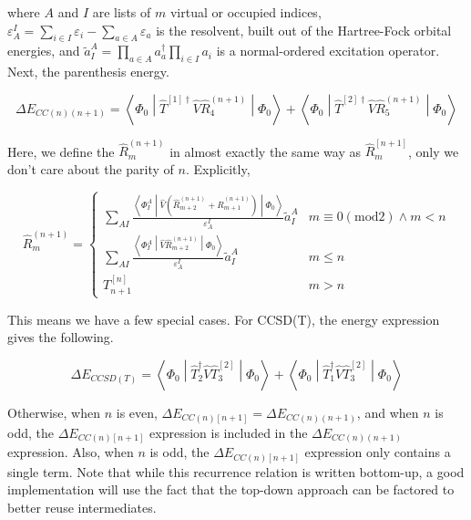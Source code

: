 \documentclass{article}
\begin{document}
where $A$ and $I$ are lists of $m$ virtual  or occupied indices, $\varepsilon_A^I = \sum_{i \in I} \varepsilon_i - \sum_{a \in A} \varepsilon_a$ is the resolvent, built out of the Hartree-Fock orbital energies, and $\tilde{a}_I^A = \prod_{a\in A}a_a^\dagger\prod_{i\in I} a_i$ is a normal-ordered excitation operator. Next, the parenthesis energy.

\begin{equation}
  \Delta E_{CC(n)(n + 1)} = \left<\Phi_0\middle|\hat{T}^{\left[1\right]\dagger}\hat{V}\hat{R}_4^{\left(n + 1\right)}\middle|\Phi_0\right> + \left<\Phi_0\middle|\hat{T}^{\left[2\right]\dagger}\hat{V}\hat{R}_5^{\left(n + 1\right)}\middle|\Phi_0\right>
\end{equation}

Here, we define the $\hat{R}_m^{\left(n + 1\right)}$ in almost exactly the same way as $\hat{R}_m^{\left[n + 1\right]}$, only we don't care about the parity of $n$. Explicitly, 

\begin{equation}
  \hat{R}_m^{\left(n + 1\right)} = \left\{\begin{matrix}
      \sum_{AI}\frac{\left<\Phi_I^A\middle|\hat{V}\left(\hat{R}_{m + 2}^{\left(n + 1\right)} + \hat{R}_{m + 1}^{\left(n + 1\right)}\right)\middle|\Phi_0\right>}{\varepsilon_A^I}\tilde{a}_I^A & m \equiv 0\left(\mathrm{mod} 2\right) \wedge m < n\\
      \sum_{AI}\frac{\left<\Phi_{I}^{A}\middle|\hat{V}\hat{R}_{m + 2}^{\left(n + 1\right)}\middle|\Phi_0\right>}{\varepsilon_A^I}\tilde{a}_I^A & m \le n\\
      T_{n + 1}^{\left[n\right]} & m > n
    \end{matrix}\right.
\end{equation}

This means we have a few special cases. For CCSD(T), the energy expression gives the following.

\begin{equation}
  \Delta E_{CCSD(T)} = \left<\Phi_0\middle|\hat{T}_2^\dagger \hat{V}\hat{T}_3^{\left[2\right]}\middle|\Phi_0\right> + \left<\Phi_0\middle|\hat{T}_1^\dagger\hat{V}\hat{T}_3^{\left[2\right]}\middle|\Phi_0\right>
\end{equation}

Otherwise, when $n$ is even, $\Delta E_{CC(n)[n + 1]} = \Delta E_{CC(n)(n + 1)}$, and when $n$ is odd, the $\Delta E_{CC(n)[n + 1]}$ expression is included in the $\Delta E_{CC(n)(n + 1)}$ expression. Also, when $n$ is odd, the $\Delta E_{CC(n)[n + 1]}$ expression only contains a single term. Note that while this recurrence relation is written bottom-up, a good implementation will use the fact that the top-down approach can be factored to better reuse intermediates.
\end{document}
